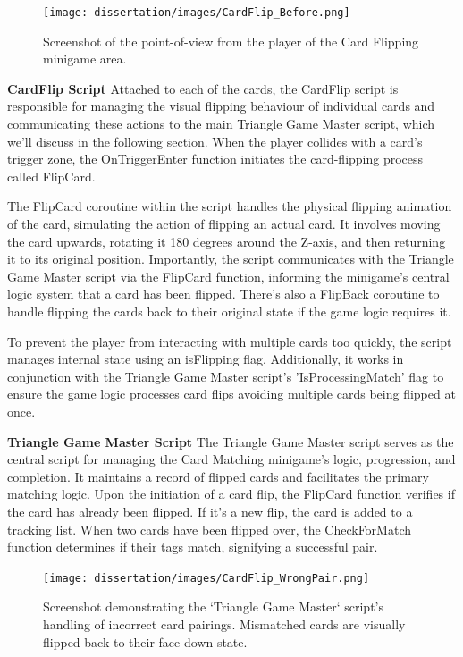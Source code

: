 \documentclass{l4proj}
\begin{document}
\begin{figure}[h]
  \centering
  \texttt{[image: dissertation/images/CardFlip\_Before.png]} 

  \caption{Screenshot of the point-of-view from the player of the Card Flipping minigame area.}

  \label{fig:card_matching_overview} 
\end{figure}

\textbf{CardFlip Script} \newline
Attached to each of the cards, the CardFlip script is responsible for managing the visual flipping behaviour of individual cards and communicating these actions to the main Triangle Game Master script, which we'll discuss in the following section. When the player collides with a card's trigger zone, the OnTriggerEnter function initiates the card-flipping process called FlipCard.

The FlipCard coroutine within the script handles the physical flipping animation of the card, simulating the action of flipping an actual card. It involves moving the card upwards, rotating it 180 degrees around the Z-axis, and then returning it to its original position. Importantly, the script communicates with the Triangle Game Master script via the FlipCard function, informing the minigame's central logic system that a card has been flipped. There's also a FlipBack coroutine to handle flipping the cards back to their original state if the game logic requires it.

To prevent the player from interacting with multiple cards too quickly, the script manages internal state using an isFlipping flag. Additionally, it works in conjunction with the Triangle Game Master script's 'IsProcessingMatch' flag to ensure the game logic processes card flips avoiding multiple cards being flipped at once.

\textbf{Triangle Game Master Script} \newline
The Triangle Game Master script serves as the central script for managing the Card Matching minigame's logic, progression, and completion. It maintains a record of flipped cards and facilitates the primary matching logic. Upon the initiation of a card flip, the FlipCard function verifies if the card has already been flipped. If it's a new flip, the card is added to a tracking list. When two cards have been flipped over, the CheckForMatch function determines if their tags match, signifying a successful pair.

\begin{figure}[h]
  \centering
  \texttt{[image: dissertation/images/CardFlip\_WrongPair.png]} 
  \caption{Screenshot demonstrating the `Triangle Game Master` script's handling of incorrect card pairings. Mismatched cards are visually flipped back to their face-down state.} 
  \label{fig:card_mismatch} 
\end{figure}
\end{document}
